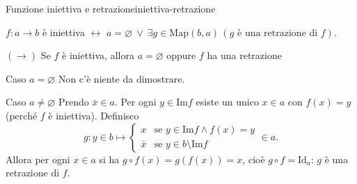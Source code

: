 
\begin{concetto}
\begin{Teorema}{Funzione iniettiva e retrazione}{iniettiva-retrazione}
    \begin{prerequisiti}
    \end{prerequisiti}
    $f \colon a \to b$ è iniettiva $\leftrightarrow$ $a = \varnothing \ \vee\ \exists g \in \mathrm{Map}(b, a)\,(g \text{ è una retrazione di } f)$.
\end{Teorema}
\begin{dimostrazione}
    \begin{caso}{$(\rightarrow)$ Se $f$ è iniettiva, allora $a = \varnothing$ oppure $f$ ha una retrazione}
        \begin{caso}{Caso $a = \varnothing$}
            Non c'è niente da dimostrare.
        \end{caso}
        \begin{caso}{Caso $a \neq \varnothing$}
            Prendo $\bar{x} \in a$. Per ogni $y \in \mathrm{Im} f$ esiste un unico $x \in a$ con $f(x) = y$ (perché $f$ è iniettiva). Definisco
            \[ g \colon y \in b \mapsto \begin{cases} x & \text{se } y \in \mathrm{Im} f \wedge f(x) = y \\ \bar{x} & \text{se } y \in b \setminus \mathrm{Im} f \end{cases} \in a. \]
            Allora per ogni $x \in a$ si ha $g \circ f(x) = g(f(x)) = x$, cioè $g \circ f = \mathrm{Id}_a$: $g$ è una retrazione di $f$.
        \end{caso}
    \end{caso}

\end{dimostrazione}
\end{concetto}
